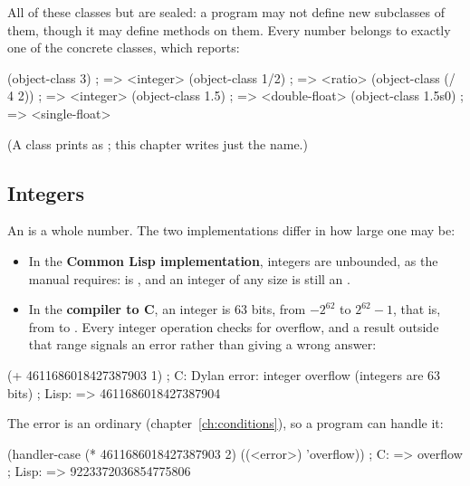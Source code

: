 \noindent All of these classes but  are sealed: a program
may not define new subclasses of them, though it may define methods on
them. Every number
belongs to exactly one of the concrete classes, which
 reports:

\begin{dylan}
(object-class 3)        ; => <integer>
(object-class 1/2)      ; => <ratio>
(object-class (/ 4 2))  ; => <integer>
(object-class 1.5)      ; => <double-float>
(object-class 1.5s0)    ; => <single-float>
\end{dylan}

\noindent (A class prints as ; this
chapter writes just the name.)

\subsection{Integers}

An  is a whole number. The two implementations differ in
how large one may be:

\begin{itemize}
\item In the \textbf{Common Lisp implementation}, integers are unbounded,
  as the manual requires:  is
  , and an integer of any size is
  still an .
\item In the \textbf{compiler to C}, an integer is 63 bits, from
  $-2^{62}$ to $2^{62}-1$, that is, from  to
  . Every integer operation checks for
  overflow, and a result outside that range signals an error rather than
  giving a wrong answer:
\end{itemize}

\begin{dylan}
(+ 4611686018427387903 1)
; C:    Dylan error: integer overflow (integers are 63 bits)
; Lisp: => 4611686018427387904
\end{dylan}

\noindent The error is an ordinary  (chapter~\ref{ch:conditions}),
so a program can handle it:

\begin{dylan}
(handler-case (* 4611686018427387903 2)
  ((<error>) 'overflow))
; C:    => overflow
; Lisp: => 9223372036854775806
\end{dylan}


